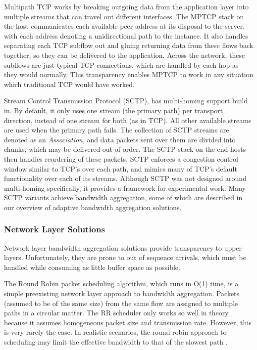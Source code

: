 \documentclass[12pt]{article}
\begin{document}
		Multipath TCP works by breaking outgoing data from the application layer into multiple streams that can travel out different interfaces. The MPTCP stack on the host communicates each available peer address at its disposal to the server, with each address denoting a unidirectional path to the instance. It also handles separating each TCP subflow out and gluing returning data from these flows back together, so they can be delivered to the application. Across the network, these subflows are just typical TCP connections, which are handled by each hop as they would normally. This transparency enables MPTCP to work in any situation which traditional TCP would have worked\cite{MPTCPNetsy}.

		Stream Control Transmission Protocol (SCTP), has multi-homing support build in. By default, it only uses one stream (the primary path) per transport direction, instead of one stream for both (as in TCP). All other available streams are used when the primary path fails. The collection of SCTP streams are denoted as an {\it Association}, and data packets sent over them are divided into chunks, which may be delivered out of order. The SCTP stack on the end hosts then handles reordering of these packets. SCTP \cite{5763587} enforces a congestion control window similar to TCP's over each path, and mimics many of TCP's default functionality over each of its streams. Although SCTP was not designed around multi-homing specifically, it provides a framework for experimental work. Many SCTP variants achieve bandwidth aggregation, some of which are described in our overview of adaptive bandwidth aggregation solutions.

	\subsubsection{Network Layer Solutions}

		Network layer bandwidth aggregation solutions provide transparency to upper layers. Unfortunately, they are prone to out of sequence arrivals, which must be handled while consuming as little buffer space as possible.

		The Round Robin packet scheduling algorithm, which runs in O(1) time, is a simple preexisting network layer approach to bandwidth aggregation. Packets (assumed to be of the same size) from the same flow are assigned to multiple paths in a circular matter. The RR scheduler only works so well in theory because it assumes homogeneous packet size and transmission rate. However, this is very rarely the case. In realistic scenarios, the round robin approach to scheduling may limit the effective bandwidth to that of the slowest path \cite{Ramaboli20121674}.
\end{document}
